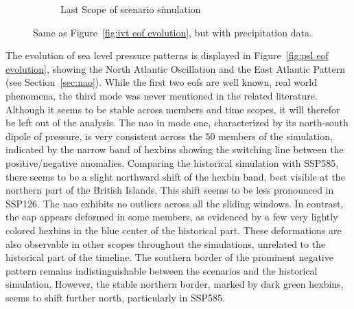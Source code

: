 \begin{figure}[!tbp]
\begin{subfigure}[b]{0.49\textwidth}
    \caption{Last Scope of scenario simulation}
    \label{fig:pr spatial patterns endscenario}
  \end{subfigure}
  \caption{Same as Figure~\ref{fig:ivt eof evolution}, but with precipitation data.}\label{fig:pr eof evolution}
\end{figure}

The evolution of sea level pressure patterns is displayed in Figure~\ref{fig:psl eof evolution}, showing the North Atlantic Oscillation  and the East Atlantic Pattern (see Section~\ref{sec:nao}). 
While the first two \acp{eof} are well known, real world phenomena, the third mode was never mentioned in the related literature. 
Although it seems to be stable across members and time scopes, it will therefor be left out of the analysis. 
The \ac{nao} in mode one, characterized by its north-south dipole of pressure, is very consistent across the 50 members of the simulation, indicated by the narrow band of hexbins showing the switching line between the positive/negative anomalies. 
Comparing the historical simulation with SSP585, there seems to be a slight northward shift of the hexbin band, best visible at the northern part of the British Islands. 
This shift seems to be less pronounced in SSP126. 
The \ac{nao} exhibits no outliers across all the sliding windows. In contrast, the \ac{eap} appears deformed in some members, as evidenced by a few very lightly colored hexbins in the blue center of the historical part. These deformations are also observable in other scopes throughout the simulations, unrelated to the historical part of the timeline.
The southern border of the prominent negative pattern remains indistinguishable between the scenarios and the historical simulation. However, the stable northern border, marked by dark green hexbins, seems to shift further north, particularly in SSP585.



